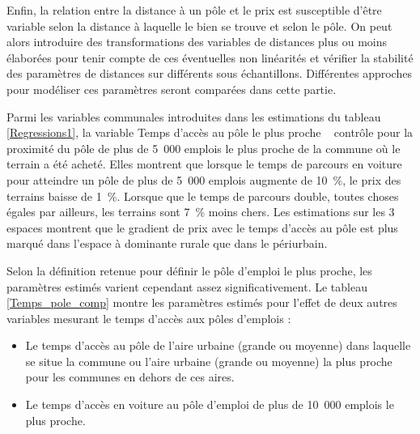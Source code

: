 \documentclass[10.5pt,a4paper]{article}
\begin{document}
{Enfin, la relation entre la distance à un pôle et le prix est susceptible d'être variable selon la distance à laquelle le bien se trouve et selon le pôle. On peut alors introduire des transformations des variables de distances plus ou moins élaborées pour tenir compte de ces éventuelles non linéarités et vérifier la stabilité des paramètres de distances sur différents sous échantillons. Différentes approches pour modéliser ces paramètres seront comparées dans cette partie. \par

Parmi les variables communales introduites dans les estimations du tableau \ref{Regressions1}, la variable \og Temps d’accès au pôle le plus proche \fg~ contrôle pour la proximité du pôle de plus de 5~000 emplois le plus proche de la commune où le terrain a été acheté. Elles montrent que lorsque le temps de parcours en voiture pour atteindre un pôle de plus de 5~000 emplois augmente de 10~\%, le prix des terrains baisse de 1~\%. Lorsque que le temps de parcours double, toutes choses égales par ailleurs, les terrains sont 7~\% moins chers. Les estimations sur les 3 espaces montrent que le gradient de prix avec le temps d'accès au pôle est plus marqué dans l'espace à dominante rurale que dans le périurbain. \par

Selon la définition retenue pour définir le pôle d'emploi le plus proche, les paramètres estimés varient cependant assez significativement. Le tableau  \ref{Temps_pole_comp} montre les paramètres estimés pour l'effet de deux autres variables mesurant le temps d'accès aux pôles d'emplois : \par 

\vspace{0.2cm}

\begin{itemize}[font=\tiny]
	\item Le temps d'accès au pôle de l'aire urbaine (grande ou moyenne) dans laquelle se situe la commune ou l'aire urbaine  (grande ou moyenne) la plus proche pour les communes en dehors de ces aires. 
	\item Le temps d'accès en voiture au pôle d'emploi de plus de 10~000 emplois le plus proche. 
\end{itemize}

}
\end{document}
